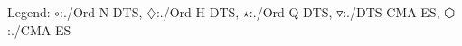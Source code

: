 Legend: {\color{NavyBlue}$\circ$}:./Ord-N-DTS, {\color{Magenta}$\diamondsuit$}:./Ord-H-DTS, {\color{Orange}$\star$}:./Ord-Q-DTS, {\color{CornflowerBlue}$\triangledown$}:./DTS-CMA-ES, {\color{red}$\varhexagon$}:./CMA-ES